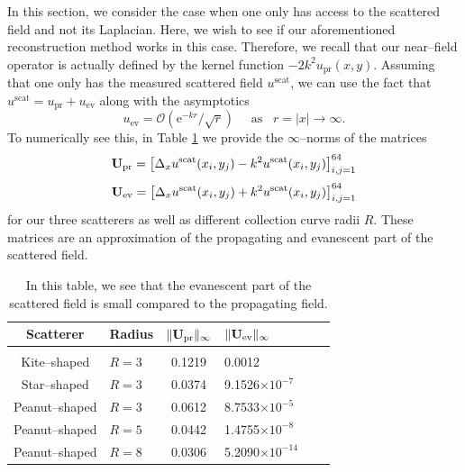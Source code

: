 \documentclass{article}
\numberwithin{equation}{section}
\begin{document}
{In this section, we consider the case when one only has access to the scattered field and not its Laplacian. Here, we wish to see if our aforementioned reconstruction method works in this case. Therefore, we recall that our near--field operator is actually defined by the kernel function $-2k^2 u_{\text{pr}} (x,y)$. Assuming that one only has the measured scattered field $u^{\text{scat}}$, we can use the fact that $u^{\text{scat}}= u_{\text{pr}} + u_{\text{ev}}$ along with the asymptotics 
$$ u_{\text{ev}} = \mathcal{O} \left({\text{e}^{-kr}}/{\sqrt{r}}\right) \quad \text{ as $\,\,\,r=|x| \to \infty.$}$$
To numerically see this, in Table \ref{small-ev} we provide the $\infty$--norms of the matrices
$${\bf U}_{\text{pr}}= \big[ \Delta_x u^{\text{scat}} (x_i , y_j) - k^2 u^{\text{scat}} (x_i , y_j) \big]_{i,j = 1}^{64}$$
$${\bf U}_{\text{ev}}= \big[ \Delta_x u^{\text{scat}} (x_i , y_j) + k^2 u^{\text{scat}} (x_i , y_j) \big]_{i,j = 1}^{64}$$
for our three scatterers as well as different collection curve radii $R$. These matrices are an approximation of the propagating and evanescent part of the scattered field.
\begin{table}[H]
	\centering
	\begin{tabular}{ c  l c l  c | c  }
		Scatterer     &  Radius & $\|  \bf{U}_{\text{pr}} \|_{\infty}$  &  $\| \bf{U}_{\text{ev}} \|_{\infty}$ \\
\hline 
\hline
		\vspace{-2.0ex}\\
		Kite--shaped  & $R=3$ & 0.1219 &  0.0012
		\vspace{1.5ex} \\ 
		Star--shaped  & $R=3$  & 0.0374  & 9.1526$\times10^{-7}$
		\vspace{1.5ex}\\
		Peanut--shaped   & $R=3$   & 0.0612  & 8.7533$\times10^{-5}$
		\vspace{1.5ex}\\ 
		Peanut--shaped   & $R=5$   & 0.0442  & 1.4755$\times10^{-8}$
		\vspace{1.5ex}\\ 
		Peanut--shaped   & $R=8$   & 0.0306  & 5.2090$\times10^{-14}$
		\vspace{1.5ex}\\ 
\hline
\end{tabular}\caption{In this table, we see that the evanescent part of the scattered field is small compared to the propagating field. } \label{small-ev}
\end{table}


}
\end{document}
